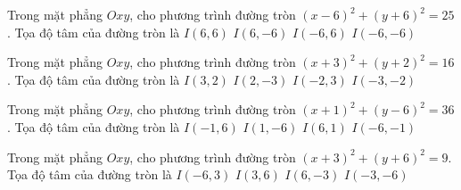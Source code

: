 \begin{ex}
Trong mặt phẳng $Oxy$, cho phương trình đường tròn $(x -6)^2   + (y + 6)^2 = 25$. Tọa độ tâm của đường tròn là
\choice
{ $I(6, 6)$ }
{ \True $I(6, -6)$ }
{ $I(-6, 6)$ }
{ $I(-6, -6)$ }
\end{ex}

\begin{ex}
Trong mặt phẳng $Oxy$, cho phương trình đường tròn $(x + 3)^2  + (y + 2)^2 = 16$. Tọa độ tâm của đường tròn là
\choice
{ $I(3, 2)$ }
{ $I(2, -3)$ }
{ $I(-2, 3)$ }
{ \True $I(-3, -2)$ }
\end{ex}

\begin{ex}
Trong mặt phẳng $Oxy$, cho phương trình đường tròn $(x + 1)^2  + (y -6)^2 = 36$. Tọa độ tâm của đường tròn là
\choice
{ \True $I(-1, 6)$ }
{ $I(1, -6)$ }
{ $I(6, 1)$ }
{ $I(-6, -1)$ }
\end{ex}

\begin{ex}
Trong mặt phẳng $Oxy$, cho phương trình đường tròn $(x + 3)^2  + (y + 6)^2 = 9$. Tọa độ tâm của đường tròn là
\choice
{ $I(-6, 3)$ }
{ $I(3, 6)$ }
{ $I(6, -3)$ }
{ \True $I(-3, -6)$ }
\end{ex}


